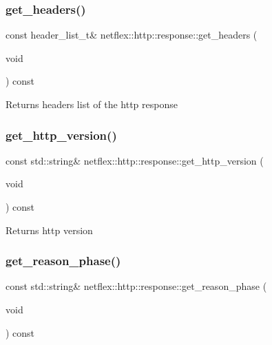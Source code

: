 \subsubsection{\texorpdfstring{get\+\_\+headers()}{get\_headers()}}
{\footnotesize\ttfamily const header\+\_\+list\+\_\+t\& netflex\+::http\+::response\+::get\+\_\+headers (\begin{DoxyParamCaption}\item[{void}]{ }\end{DoxyParamCaption}) const}

\begin{DoxyReturn}{Returns}
headers list of the http response 
\end{DoxyReturn}
\mbox{\label{classnetflex_1_1http_1_1response_a1f6462ae67d321210e3acba1cbc91674}} 
\subsubsection{\texorpdfstring{get\+\_\+http\+\_\+version()}{get\_http\_version()}}
{\footnotesize\ttfamily const std\+::string\& netflex\+::http\+::response\+::get\+\_\+http\+\_\+version (\begin{DoxyParamCaption}\item[{void}]{ }\end{DoxyParamCaption}) const}

\begin{DoxyReturn}{Returns}
http version 
\end{DoxyReturn}
\mbox{\label{classnetflex_1_1http_1_1response_a3c09893bbf3974704fbe594f63cecdb4}} 
\subsubsection{\texorpdfstring{get\+\_\+reason\+\_\+phase()}{get\_reason\_phase()}}
{\footnotesize\ttfamily const std\+::string\& netflex\+::http\+::response\+::get\+\_\+reason\+\_\+phase (\begin{DoxyParamCaption}\item[{void}]{ }\end{DoxyParamCaption}) const}

